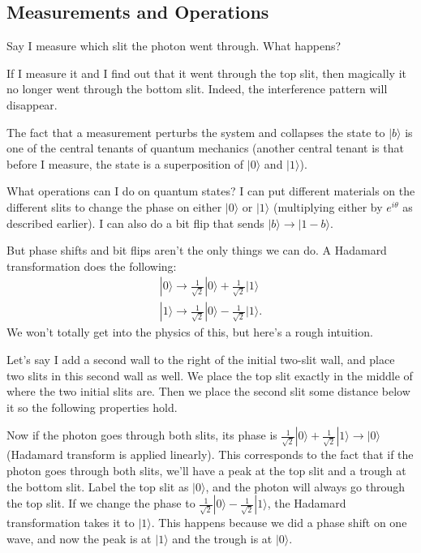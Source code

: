 \subsection{Measurements and Operations}

Say I measure which slit the photon went through. What happens?

If I measure it and I find out that it went through the top slit, then magically it no longer went through the bottom slit. Indeed, the interference pattern will disappear.

The fact that a measurement perturbs the system and collapses the state to $|b\rangle$ is one of the central tenants of quantum mechanics (another central tenant is that before I measure, the state is a superposition of $|0 \rangle$ and $|1 \rangle$).

What operations can I do on quantum states? I can put different materials on the different slits to change the phase on either $| 0 \rangle$ or $| 1\rangle$ (multiplying either by $e^{i\theta}$ as described earlier). I can also do a bit flip that sends $|b\rangle \rightarrow |1-b\rangle$.

But phase shifts and bit flips aren't the only things we can do. A Hadamard transformation does the following:
\begin{align*}
| 0 \rangle \rightarrow \frac{1}{\sqrt{2}}| 0 \rangle + \frac{1}{\sqrt{2}}|1 \rangle\\
| 1 \rangle \rightarrow \frac{1}{\sqrt{2}}| 0 \rangle - \frac{1}{\sqrt{2}}|1 \rangle.
\end{align*}
We won't totally get into the physics of this, but here's a rough intuition.

Let's say I add a second wall to the right of the initial two-slit wall, and place two slits in this second wall as well. We place the top slit exactly in the middle of where the two initial slits are. Then we place the second slit some distance below it so the following properties hold.

Now if the photon goes through both slits, its phase is $\frac{1}{\sqrt{2}} | 0 \rangle + \frac{1}{\sqrt{2}} | 1\rangle \rightarrow | 0 \rangle$ (Hadamard transform is applied linearly). This corresponds to the fact that if the photon goes through both slits, we'll have a peak at the top slit and a trough at the bottom slit. Label the top slit as $| 0 \rangle$, and the photon will always go through the top slit. If we change the phase to $\frac{1}{\sqrt{2}} | 0 \rangle -\frac{1}{\sqrt{2}} | 1\rangle$, the Hadamard transformation takes it to $| 1\rangle$. This happens because we did a phase shift on one wave, and now the peak is at $|1 \rangle$ and the trough is at $|0 \rangle$.

